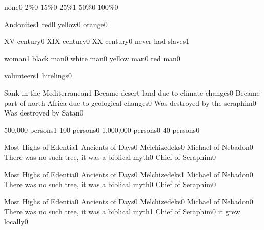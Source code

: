 {none}{0}
{2\%}{0}
{15\%}{0}
{25\%}{1}
{50\%}{0}
{100\%}{0}
\qstop

{Andonites}{1}
{red}{0}
{yellow}{0}
{orange}{0}
\qstop


{XV century}{0}
{XIX century}{0}
{XX century}{0}
{never had slaves}{1}
\qstop

{woman}{1}
{black man}{0}
{white man}{0}
{yellow man}{0}
{red man}{0}
\qstop





{volunteers}{1}
{hirelings}{0}
\qstop

{Sank in the Mediterranean}{1}
{Became desert land due to climate changes}{0}
{Became part of north Africa due to geological changes}{0}
{Was destroyed by the seraphim}{0}
{Was destroyed by Satan}{0}
\qstop

{500,000 persons}{1}
{100 persons}{0}
{1,000,000 persons}{0}
{40 persons}{0}
\qstop

{Most Highs of Edentia}{1}
{Ancients of Days}{0}
{Melchizedeks}{0}
{Michael of Nebadon}{0}
{There was no such tree, it was a biblical myth}{0}
{Chief of Seraphim}{0}
\qstop

{Most Highs of Edentia}{0}
{Ancients of Days}{0}
{Melchizedeks}{1}
{Michael of Nebadon}{0}
{There was no such tree, it was a biblical myth}{0}
{Chief of Seraphim}{0}
\qstop

{Most Highs of Edentia}{0}
{Ancients of Days}{0}
{Melchizedeks}{0}
{Michael of Nebadon}{0}
{There was no such tree, it was a biblical myth}{1}
{Chief of Seraphim}{0}
{it grew locally}{0}
\qstop

